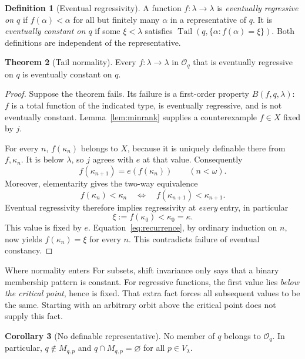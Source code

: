 \documentclass[11pt,letterpaper]{article}
\theoremstyle{definition}
\newtheorem{definition}{Definition}[section]
\newtheorem{theorem}[definition]{Theorem}
\newtheorem{corollary}[definition]{Corollary}
\numberwithin{equation}{section}
\newcommand{\Tail}{\operatorname{Tail}}
\begin{document}
\begin{definition}[Eventual regressivity]
A function $f:\lambda\to\lambda$ is \emph{eventually regressive on
$q$} if $f(\alpha)<\alpha$ for all but finitely many $\alpha$ in a
representative of $q$. It is \emph{eventually constant on $q$} if some
$\xi<\lambda$ satisfies $\Tail(q,\{\alpha:f(\alpha)=\xi\})$.
Both definitions are independent of the representative.
\end{definition}

\begin{theorem}[Tail normality]\label{thm:tailnormal}
Every $f:\lambda\to\lambda$ in $\mathcal O_q$ that is eventually
regressive on $q$ is eventually constant on $q$.
\end{theorem}

\begin{proof}
Suppose the theorem fails. Its failure is a first-order property
$B(f,q,\lambda)$: $f$ is a total function of the indicated type, is
eventually regressive, and is not eventually constant.
Lemma~\ref{lem:minrank} supplies a counterexample $f\in X$ fixed by $j$.

For every $n$, $f(\kappa_n)$ belongs to $X$, because it is uniquely
definable there from $f,\kappa_n$. It is below $\lambda$, so $j$ agrees
with $e$ at that value. Consequently
\begin{equation}\label{eq:recurrence}
 f(\kappa_{n+1})=e(f(\kappa_n))\qquad(n<\omega).
\end{equation}
Moreover, elementarity gives the two-way equivalence
\[
 f(\kappa_n)<\kappa_n
 \quad\Longleftrightarrow\quad
 f(\kappa_{n+1})<\kappa_{n+1}.
\]
Eventual regressivity therefore implies regressivity at \emph{every}
entry, in particular
\[
 \xi:=f(\kappa_0)<\kappa_0=\kappa.
\]
This value is fixed by $e$. Equation~\eqref{eq:recurrence}, by ordinary
induction on $n$, now yields $f(\kappa_n)=\xi$ for every $n$.
This contradicts failure of eventual constancy.
\end{proof}

\begin{assessment}{Where normality enters}
For subsets, shift invariance only says that a binary membership
pattern is constant. For regressive functions, the first value lies
\emph{below the critical point}, hence is fixed. That extra fact forces
all subsequent values to be the same. Starting with an arbitrary
orbit above the critical point does not supply this fact.
\end{assessment}

\begin{corollary}[No definable representative]\label{cor:norep}
No member of $q$ belongs to $\mathcal O_q$. In particular,
$q\notin M_{q,p}$ and $q\cap M_{q,p}=\varnothing$ for all $p\in V_\lambda$.
\end{corollary}
\end{document}
